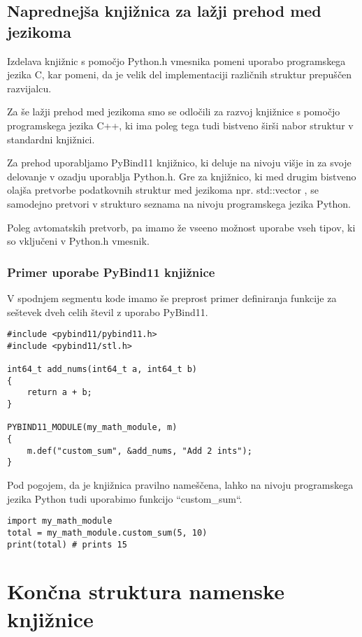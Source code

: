 \documentclass[a4paper,12pt,openright]{book}
\begin{document}
    \subsection{Naprednejša knjižnica za lažji prehod med jezikoma}

    Izdelava knjižnic s pomočjo Python.h vmesnika pomeni uporabo programskega jezika C, kar pomeni, da je velik del implementaciji različnih struktur prepuščen razvijalcu.
    
    Za še lažji prehod med jezikoma smo se odločili za razvoj knjižnice s pomočjo programskega jezika C++, ki ima poleg tega tudi bistveno širši nabor struktur v standardni knjižnici. 

    Za prehod uporabljamo PyBind11 \cite{PYBIND11_GITHUB} knjižnico, ki deluje na nivoju višje in za svoje delovanje v ozadju uporablja Python.h. Gre za knjižnico, ki med drugim bistveno olajša pretvorbe podatkovnih struktur med jezikoma npr. std::vector \cite{CPP_VECTOR}, se samodejno pretvori v strukturo seznama na nivoju programskega jezika Python.

    Poleg avtomatskih pretvorb, pa imamo že vseeno možnost uporabe vseh tipov, ki so vključeni v Python.h vmesnik.

    \subsubsection{Primer uporabe PyBind11 knjižnice}
    V spodnjem segmentu kode imamo še preprost primer definiranja funkcije za seštevek dveh celih števil z uporabo PyBind11.
\begin{verbatim}
#include <pybind11/pybind11.h>
#include <pybind11/stl.h>

int64_t add_nums(int64_t a, int64_t b)
{
    return a + b;
}

PYBIND11_MODULE(my_math_module, m)
{
    m.def("custom_sum", &add_nums, "Add 2 ints");
}
\end{verbatim}

    \noindent
    Pod pogojem, da je knjižnica pravilno nameščena, lahko na nivoju programskega jezika Python tudi uporabimo funkcijo ``custom\_sum``.
\begin{verbatim}
import my_math_module
total = my_math_module.custom_sum(5, 10)
print(total) # prints 15
\end{verbatim}

    \newpage
    \section{Končna struktura namenske knjižnice}
\end{document}
